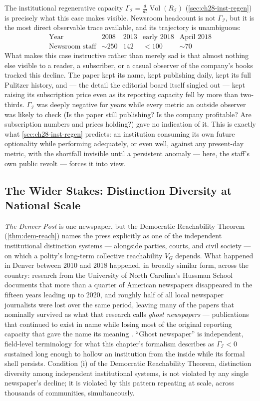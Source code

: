 \documentclass[12pt,twoside,openright]{book}
\newcommand{\Vol}{\operatorname{Vol}}
\begin{document}
The institutional regenerative capacity
$\Gamma_\mathcal{I} = \frac{d}{dt}\Vol(R_\mathcal{I})$
(\cref{sec:ch28-inst-regen}) is precisely what this case makes
visible. Newsroom headcount is not $\Gamma_\mathcal{I}$, but it
is the most direct observable trace available, and its trajectory
is unambiguous:
\[
  \begin{array}{c|cccc}
    \text{Year} & 2008 & 2013 & \text{early } 2018 & \text{April } 2018 \\
    \text{Newsroom staff} & {\sim}250 & 142 & {<}100 & {\sim}70
  \end{array}
\]
What makes this case instructive rather than merely sad is that
almost nothing else visible to a reader, a subscriber, or a
casual observer of the company's books tracked this decline.
The paper kept its name, kept publishing daily, kept its full
Pulitzer history, and --- the detail the editorial board itself
singled out --- kept raising its subscription price even as its
reporting capacity fell by more than two-thirds. $\Gamma_\mathcal{I}$
was deeply negative for years while every metric an outside
observer was likely to check (Is the paper still publishing?
Is the company profitable? Are subscription numbers and prices
holding?) gave no indication of it. This is exactly what
\cref{sec:ch28-inst-regen} predicts: an institution consuming its
own future optionality while performing adequately, or even
well, against any present-day metric, with the shortfall
invisible until a persistent anomaly --- here, the staff's own
public revolt --- forces it into view.

\subsection{The Wider Stakes: Distinction Diversity at National Scale}

\emph{The Denver Post} is one newspaper, but the Democratic
Reachability Theorem (\cref{thm:dem-reach}) names the press
explicitly as one of the independent institutional distinction
systems --- alongside parties, courts, and civil society --- on
which a polity's long-term collective reachability $V_G$ depends.
What happened in Denver between 2010 and 2018 happened, in
broadly similar form, across the country: research from the
University of North Carolina's Hussman School documents that
more than a quarter of American newspapers disappeared in the
fifteen years leading up to 2020, and roughly half of all local
newspaper journalists were lost over the same period, leaving
many of the papers that nominally survived as what that research
calls \emph{ghost newspapers} --- publications that continued to
exist in name while losing most of the original reporting
capacity that gave the name its meaning
\parencite{abernathy2020}. ``Ghost newspaper'' is independent,
field-level terminology for what this chapter's formalism
describes as $\Gamma_\mathcal{I} < 0$ sustained long enough to
hollow an institution from the inside while its formal shell
persists. Condition (i) of the Democratic Reachability Theorem,
distinction diversity among independent institutional systems, is
not violated by any single newspaper's decline; it is violated by
this pattern repeating at scale, across thousands of communities,
simultaneously.
\end{document}
